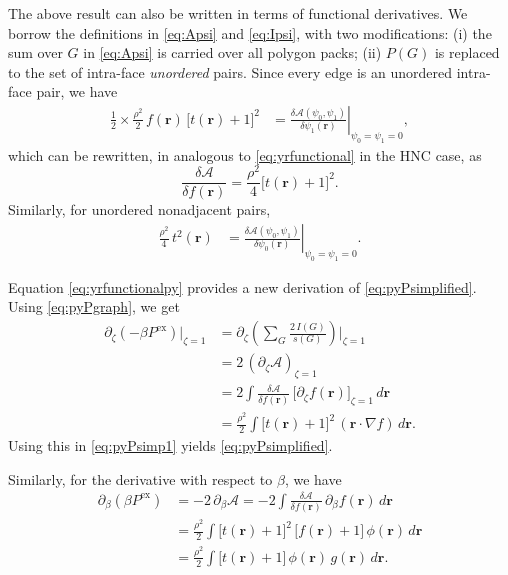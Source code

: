\documentclass[preprint]{revtex4-1}
\newcommand{\vct}[1]{\mathbf{#1}}
\providecommand{\vr}{} %
\renewcommand{\vr}{\vct{r}}
\newcommand{\supex}[1]{ { { #1 }^{ \mathrm{ex} } } }
\newcommand{\Pex}{\supex{P}}
\newcommand{\A}{\mathcal{A}}
\begin{document}
The above result can also be written
in terms of functional derivatives.
%
We borrow the definitions in
\eqref{eq:Apsi} and \eqref{eq:Ipsi},
with two modifications:
(i) the sum over $G$ in \eqref{eq:Apsi}
is carried over all polygon packs;
(ii) $P(G)$ is replaced to the set of intra-face \emph{unordered} pairs.
%
Since every edge is an unordered intra-face pair,
we have
%
\begin{align*}
\frac 1 2 \times \frac{\rho^2}{2} \, f(\vr) \, \bigl[ t(\vr) + 1 \bigr]^2
&=
\left.
\frac{ \delta \A(\psi_0, \psi_1) } { \delta \psi_1(\vr) }
\right|_{\psi_0 = \psi_1 = 0},
\end{align*}
which can be rewritten,
in analogous to \eqref{eq:yrfunctional} in the HNC case,
as
\begin{equation}
  \frac{ \delta \A } { \delta f(\vr)}
=
  \frac{ \rho^2 } {4}
  \bigl[ t(\vr) + 1 \bigr]^2.
  \label{eq:yrfunctionalpy}
\end{equation}
%
Similarly, for unordered nonadjacent pairs,
\begin{align*}
\frac{\rho^2}{4} \, t^2(\vr)
&=
\left.
\frac{ \delta \A(\psi_0, \psi_1) } { \delta \psi_0(\vr) }
\right|_{\psi_0 = \psi_1 = 0}.
\end{align*}
%


Equation \eqref{eq:yrfunctionalpy} provides a new derivation of \eqref{eq:pyPsimplified}.
%
Using \eqref{eq:pyPgraph}, we get
%
\begin{align*}
  \partial_\zeta (-\beta \Pex) \big|_{\zeta = 1}
&=
  \partial_\zeta \left( \sum_G \frac { 2 \, I(G) } { s(G) } \right) \Bigg|_{\zeta = 1}
\\
&=
  2 \, (\partial_\zeta \A)_{\zeta = 1}
\\
&=
  2 \int \frac{ \delta \A } { \delta f(\vr) } \,
  \big[ \partial_\zeta f(\vr) \big]_{\zeta = 1} \, d\vr
\\
&=
  \frac{\rho^2}{2}
  \int \bigl[ t(\vr) + 1 \bigr]^2 \,
  (\vr \cdot \nabla f) \, d\vr.
\end{align*}
%
Using this in \eqref{eq:pyPsimp1} yields \eqref{eq:pyPsimplified}.

Similarly,
for the derivative with respect to $\beta$, we have
\begin{align*}
  \partial_\beta (\beta \Pex)
&=
  -2 \, \partial_\beta \A
=
  -2 \int \frac{ \delta \A } { \delta f(\vr) } \,
  \partial_\beta f(\vr) \, d\vr
\\
&=
  \frac{\rho^2}{2}
  \int \bigl[ t(\vr) + 1 \bigr]^2 \,
  \big[ f(\vr) + 1 \bigr] \,
  \phi(\vr) \, d\vr
\\
&=
  \frac{\rho^2}{2}
  \int
  \bigl[ t(\vr) + 1 \bigr] \,
  \phi(\vr) \,
  g(\vr) \,
  d\vr.
\end{align*}
%
\end{document}
